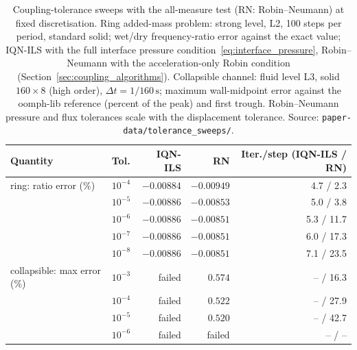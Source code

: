 \begin{table}[htbp]
	\centering
	\small
	\caption{Coupling-tolerance sweeps with the all-measure test (RN: Robin--Neumann) at fixed discretisation. Ring added-mass problem: strong level, L2, 100 steps per period, standard solid; wet/dry frequency-ratio error against the exact value; IQN-ILS with the full interface pressure condition~\eqref{eq:interface_pressure}, Robin--Neumann with the acceleration-only Robin condition (Section~\ref{sec:coupling_algorithms}). Collapsible channel: fluid level L3, solid $160\times8$ (high order), $\Delta t = 1/160\,\mathrm{s}$; maximum wall-midpoint error against the oomph-lib reference (percent of the peak) and first trough. Robin--Neumann pressure and flux tolerances scale with the displacement tolerance. Source: \texttt{paper-data/tolerance\_sweeps/}.}
	\label{tab:tol_sweeps}
	\setlength{\tabcolsep}{4pt}
	\begin{tabular}{llrrr}
		\toprule
		Quantity & Tol. & IQN-ILS & RN & Iter./step (IQN-ILS / RN) \\
		\midrule
		ring: ratio error (\%) & $10^{-4}$ & $-0.00884$ & $-0.00949$ & 4.7 / 2.3 \\
		 & $10^{-5}$ & $-0.00886$ & $-0.00853$ & 5.0 / 3.8 \\
		 & $10^{-6}$ & $-0.00886$ & $-0.00851$ & 5.3 / 11.7 \\
		 & $10^{-7}$ & $-0.00886$ & $-0.00851$ & 6.0 / 17.3 \\
		 & $10^{-8}$ & $-0.00886$ & $-0.00851$ & 7.1 / 23.5 \\
		\midrule
		collapsible: max error (\%) & $10^{-3}$ & failed & $0.574$ & -- / 16.3 \\
		 & $10^{-4}$ & failed & $0.522$ & -- / 27.9 \\
		 & $10^{-5}$ & failed & $0.520$ & -- / 42.7 \\
		 & $10^{-6}$ & failed & failed & -- / -- \\
		\bottomrule
	\end{tabular}
\end{table}

